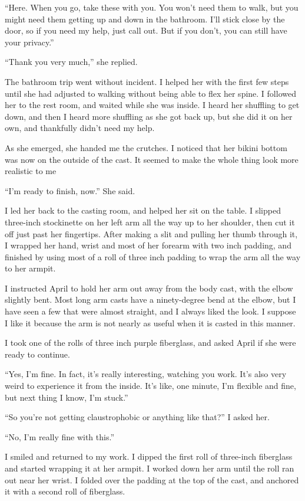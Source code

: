 ``Here. When you go, take these with you. You won't need them to walk, but you might need them
getting up and down in the bathroom. I'll stick close by the door, so if you need my help, just
call out. But if you don't, you can still have your privacy.''

``Thank you very much,'' she replied.

The bathroom trip went without incident. I helped her with the first few steps until she had
adjusted to walking without being able to flex her spine. I followed her to the rest room, and
waited while she was inside. I heard her shuffling to get down, and then I heard more shuffling
as she got back up, but she did it on her own, and thankfully didn't need my help.

As she emerged, she handed me the crutches. I noticed that her bikini bottom was now on the
outside of the cast. It seemed to make the whole thing look more realistic to me

``I'm ready to finish, now.'' She said.

I led her back to the casting room, and helped her sit on the table. I slipped three-inch
stockinette on her left arm all the way up to her shoulder, then cut it off just past her
fingertips. After making a slit and pulling her thumb through it, I wrapped her hand, wrist and
most of her forearm with two inch padding, and finished by using most of a roll of three inch
padding to wrap the arm all the way to her armpit.

I instructed April to hold her arm out away from the body cast, with the elbow slightly bent.
Most long arm casts have a ninety-degree bend at the elbow, but I have seen a few that were
almost straight, and I always liked the look. I suppose I like it because the arm is not nearly
as useful when it is casted in this manner.

I took one of the rolls of three inch purple fiberglass, and asked April if she were ready to
continue.

``Yes, I'm fine. In fact, it's really interesting, watching you work. It's also very weird to
experience it from the inside. It's like, one minute, I'm flexible and fine, but next thing I
know, I'm stuck.''

``So you're not getting claustrophobic or anything like that?'' I asked her.

``No, I'm really fine with this.''

I smiled and returned to my work. I dipped the first roll of three-inch fiberglass and started
wrapping it at her armpit. I worked down her arm until the roll ran out near her wrist. I folded
over the padding at the top of the cast, and anchored it with a second roll of fiberglass.

